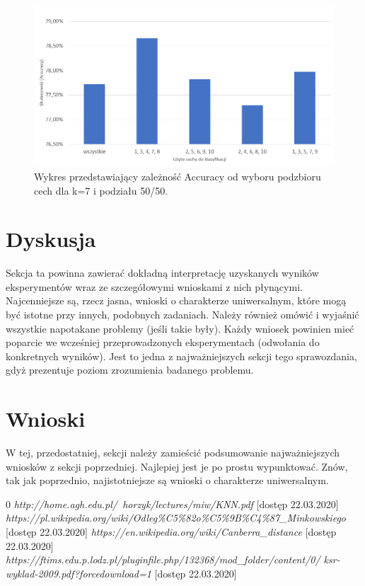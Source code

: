 \documentclass{classrep}
\begin{document}
\begin{figure}[h!]
    \centering
    \includegraphics[width=1\textwidth]{cechy7manh5050.png}
    \caption{Wykres przedstawiający zależność Accuracy od wyboru podzbioru cech dla k=7 i podziału 50/50.}
    \label{cechy}
\end{figure}

\newpage
\section{Dyskusja} %
{\color{blue}
Sekcja ta powinna zawierać dokładną interpretację uzyskanych wyników
eksperymentów wraz ze szczegółowymi wnioskami z nich płynącymi. Najcenniejsze
są, rzecz jasna, wnioski o charakterze uniwersalnym, które mogą być istotne
przy innych, podobnych zadaniach. Należy również omówić i wyjaśnić wszystkie
napotakane problemy (jeśli takie były). Każdy wniosek powinien mieć poparcie
we wcześniej przeprowadzonych eksperymentach (odwołania do konkretnych
wyników). Jest to jedna z najważniejszych sekcji tego sprawozdania, gdyż
prezentuje poziom zrozumienia badanego problemu.}
\section{Wnioski}
{\color{blue}W tej, przedostatniej, sekcji należy zamieścić podsumowanie
najważniejszych wniosków z sekcji poprzedniej. Najlepiej jest je po prostu
wypunktować. Znów, tak jak poprzednio, najistotniejsze są wnioski o
charakterze uniwersalnym.}


\begin{thebibliography} {0}
 \textsl{http://home.agh.edu.pl/~horzyk/lectures/miw/KNN.pdf} [dostęp 22.03.2020]
 \textsl{https://pl.wikipedia.org/wiki/Odleg\%C5\%82o\%C5\%9B\%C4\%87\_Minkowskiego} [dostęp 22.03.2020]
 \textsl{https://en.wikipedia.org/wiki/Canberra\_distance} [dostęp 22.03.2020]
 \textsl{https://ftims.edu.p.lodz.pl/pluginfile.php/132368/mod\_folder/content/0/
ksr-wyklad-2009.pdf?forcedownload=1} [dostęp 22.03.2020]
\end{thebibliography}
\end{document}
